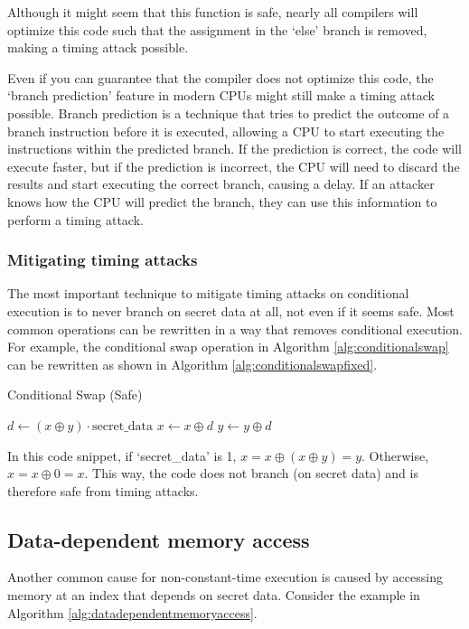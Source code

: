\documentclass[11pt,a4paper]{report}
\theoremstyle{definition}
\begin{document}
Although it might seem that this function is safe, nearly all compilers will optimize this code such that the assignment in the `else' branch is removed, making a timing attack possible.

Even if you can guarantee that the compiler does not optimize this code, the `branch prediction' feature in modern CPUs might still make a timing attack possible. Branch prediction is a technique that tries to predict the outcome of a branch instruction before it is executed, allowing a CPU to start executing the instructions within the predicted branch. If the prediction is correct, the code will execute faster, but if the prediction is incorrect, the CPU will need to discard the results and start executing the correct branch, causing a delay. If an attacker knows how the CPU will predict the branch, they can use this information to perform a timing attack.

\subsubsection{Mitigating timing attacks}
The most important technique to mitigate timing attacks on conditional execution is to never branch on secret data at all, not even if it seems safe. Most common operations can be rewritten in a way that removes conditional execution. For example, the conditional swap operation in Algorithm \ref{alg:conditionalswap} can be rewritten as shown in Algorithm \ref{alg:conditionalswapfixed}.

\begin{algorithm}
  \caption{Conditional Swap (Safe)}
  \label{alg:conditionalswapfixed}
  \begin{algorithmic}[1]
      \State $d \gets (x \oplus y) \cdot \text{secret\_data}$ 
      \State $x \gets x \oplus d$
      \State $y \gets y \oplus d$
    \EndFunction
  \end{algorithmic}
\end{algorithm}

In this code snippet, if `secret\_data' is 1, $x = x \oplus (x \oplus y) = y$. Otherwise, $x = x \oplus 0 = x$. This way, the code does not branch (on secret data) and is therefore safe from timing attacks.

\subsection{Data-dependent memory access}
\label{sec:datadependentmemoryaccess}
Another common cause for non-constant-time execution is caused by accessing memory at an index that depends on secret data. Consider the example in Algorithm \ref{alg:datadependentmemoryaccess}.
\end{document}
